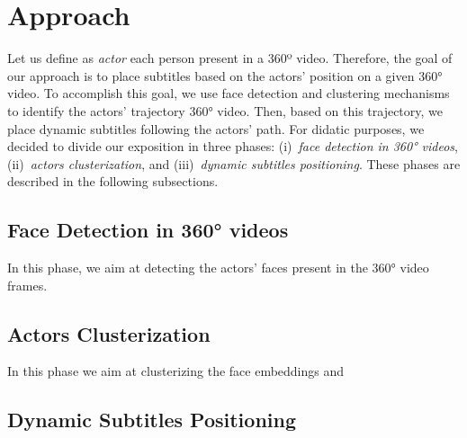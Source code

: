 \section{Approach}
\label{sec:approach}
Let us define as \emph{actor} each person present in a 360º video. Therefore, the goal of our approach is to place subtitles based on the actors' position on a given 360° video. To accomplish this goal, we use face detection and clustering mechanisms to identify the actors' trajectory 360° video. Then, based on this trajectory, we place dynamic subtitles following the actors' path. For didatic purposes, we decided to divide our exposition in three phases: (i)~\emph{face detection in 360° videos}, (ii)~\emph{actors clusterization}, and (iii)~\emph{dynamic subtitles positioning}. These phases are described in the following subsections. 

\subsection{Face Detection in 360° videos}

In this phase, we aim at detecting the actors' faces present in the 360° video frames.

\subsection{Actors Clusterization}

In this phase we aim at clusterizing the face embeddings and 

\subsection{Dynamic Subtitles Positioning}

